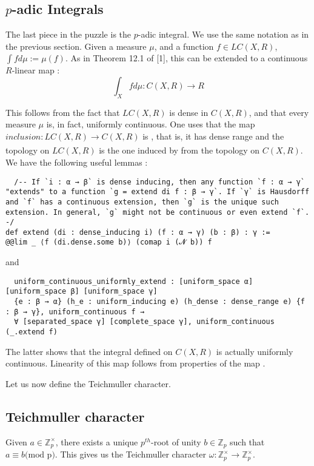 \documentclass[11pt]{article}
\begin{document}
\subsection{$p$-adic Integrals}
The last piece in the puzzle is the $p$-adic integral. We use the same notation as in the previous
section. Given a measure $\mu$, and a function $f \in LC(X, R)$,
$\int f d\mu := \mu(f)$. As in Theorem 12.1 of [1], this can be extended to a
continuous $R$-linear map :
$$ \int_X f d\mu : C(X, R) \xrightarrow[]{} R $$

This follows from the fact that $LC(X, R)$ is dense in $C(X, R)$, and that every measure $\mu$ is,
in fact, uniformly continuous. One uses that the map $inclusion : LC(X, R) \xrightarrow[]{} C(X, R)$
is , that is, it has dense range and the topology on $LC(X, R)$ is the one
induced by  from the topology on $C(X,R)$. We have the following useful lemmas :
\begin{lstlisting}
  /-- If `i : α → β` is dense inducing, then any function `f : α → γ` "extends" to a function `g = extend di f : β → γ`. If `γ` is Hausdorff and `f` has a continuous extension, then `g` is the unique such extension. In general, `g` might not be continuous or even extend `f`. -/
def extend (di : dense_inducing i) (f : α → γ) (b : β) : γ :=
@@lim _ ⟨f (di.dense.some b)⟩ (comap i (𝓝 b)) f
\end{lstlisting}
and
\begin{lstlisting}
  uniform_continuous_uniformly_extend : [uniform_space α] [uniform_space β] [uniform_space γ]
  {e : β → α} (h_e : uniform_inducing e) (h_dense : dense_range e) {f : β → γ}, uniform_continuous f →
  ∀ [separated_space γ] [complete_space γ], uniform_continuous (_.extend f)
\end{lstlisting}
The latter shows that the integral defined on $C(X, R)$ is actually uniformly continuous. Linearity
of this map follows from properties of the  map .

Let us now define the Teichmuller character.
\subsection{Teichmuller character}
Given $a \in \mathbb{Z}_p^{\times}$, there exists a unique $p^{th}$-root of unity
$b \in \mathbb{Z}_p$ such that $a \equiv b \text{(mod p)}$.
This gives us the Teichmuller character
$\omega : \mathbb{Z}_p^{\times} \xrightarrow[]{} \mathbb{Z}_p^{\times}$. \\
\end{document}
